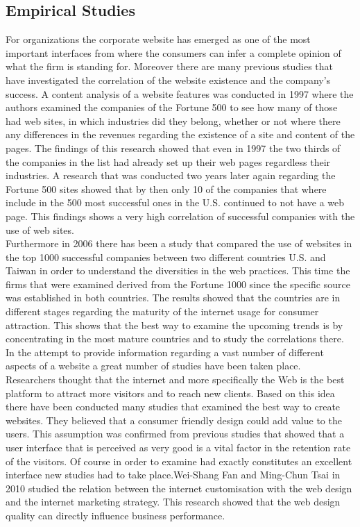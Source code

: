 \documentclass{article}
\begin{document}
\subsection{Empirical Studies}
For organizations the corporate website has emerged as one of the most important interfaces from where the consumers can infer a complete opinion of what the firm is standing for. Moreover there are many previous studies that have investigated the correlation of the website existence and the company's success. A content analysis of a website features was conducted in 1997\cite{key7} where the authors examined the companies of the Fortune 500 to see how many of those had web sites, in which industries did they belong, whether or not where there any differences in the revenues regarding the existence of a site and content of the pages. The findings of this research showed that even in 1997 the two thirds of the companies in the list had already set up their web pages regardless their industries. A research that was conducted two years later\cite{key10} again regarding the Fortune 500 sites showed that by then only 10 of the companies that where include in the 500 most successful ones in the U.S. continued to not have a web page. This findings shows a very high correlation of successful companies with the use of web sites.\\
Furthermore in 2006 there has been a study that compared the use of websites in the top 1000 successful companies between two different countries\cite{key2} U.S. and Taiwan in order to understand the diversities in the web practices. This time the firms that were examined derived from the Fortune 1000 since the specific source was established in both countries. The results showed that the countries are in different stages regarding the maturity of the internet usage for consumer attraction. This shows that the best way to examine the upcoming trends is by concentrating in the most mature countries and to study the correlations there.\\
In the attempt to provide information regarding a vast number of different aspects of a website a great number of studies have been taken place.\\
Researchers thought that the internet and more specifically the Web is the best platform to attract more visitors and to reach new clients.\cite{key4} Based on this idea there have been conducted many studies that examined the best way to create websites. They believed that a consumer friendly design could add value to the users. This assumption was confirmed from previous studies that showed that a user interface that is perceived as very good is a vital factor in the retention rate of the visitors.\cite{key6} Of course in order to examine had exactly constitutes an excellent interface new studies had to take place.Wei-Shang Fan and Ming-Chun Tsai\cite{key5} in 2010 studied the relation between the internet customisation with the web design and the internet marketing strategy. This research showed that the web design quality can directly influence business performance.\\
\end{document}
